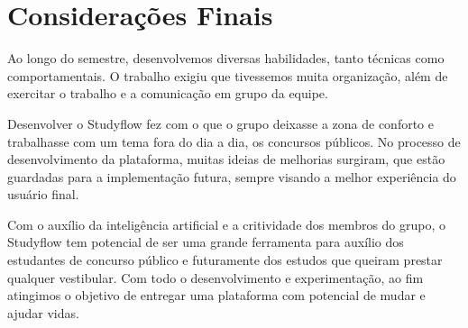 \chapter{Considerações Finais}

Ao longo do semestre, desenvolvemos diversas habilidades, tanto técnicas como comportamentais. O trabalho exigiu que tivessemos muita organização, além de exercitar o trabalho e a comunicação em grupo da equipe.

Desenvolver o Studyflow fez com o que o grupo deixasse a zona de conforto e trabalhasse com um tema fora do dia a dia, os concursos públicos. No processo de desenvolvimento da plataforma, muitas ideias de melhorias surgiram, que estão guardadas para a implementação futura, sempre visando a melhor experiência do usuário final.

Com o auxílio da inteligência artificial e a critividade dos membros do grupo, o Studyflow tem potencial de ser uma grande ferramenta para auxílio dos estudantes de concurso público e futuramente dos estudos que queiram prestar qualquer vestibular. Com todo o desenvolvimento e experimentação, ao fim atingimos o objetivo de entregar uma plataforma com potencial de mudar e ajudar vidas.